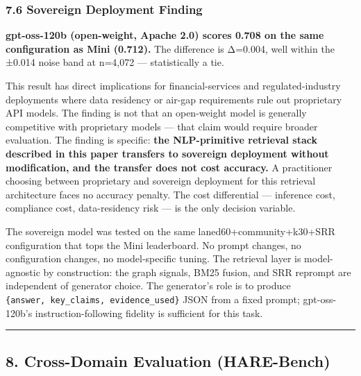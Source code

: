 \subsubsection{7.6 Sovereign Deployment Finding}\label{sovereign-deployment-finding}

\textbf{gpt-oss-120b (open-weight, Apache 2.0) scores 0.708 on the same configuration as Mini (0.712).} The difference is Δ=0.004, well within the ±0.014 noise band at n=4,072 --- statistically a tie.

This result has direct implications for financial-services and regulated-industry deployments where data residency or air-gap requirements rule out proprietary API models. The finding is not that an open-weight model is generally competitive with proprietary models --- that claim would require broader evaluation. The finding is specific: \textbf{the NLP-primitive retrieval stack described in this paper transfers to sovereign deployment without modification, and the transfer does not cost accuracy.} A practitioner choosing between proprietary and sovereign deployment for this retrieval architecture faces no accuracy penalty. The cost differential --- inference cost, compliance cost, data-residency risk --- is the only decision variable.

The sovereign model was tested on the same laned60+community+k30+SRR configuration that tops the Mini leaderboard. No prompt changes, no configuration changes, no model-specific tuning. The retrieval layer is model-agnostic by construction: the graph signals, BM25 fusion, and SRR reprompt are independent of generator choice. The generator's role is to produce \texttt{\{answer,\ key\_claims,\ evidence\_used\}} JSON from a fixed prompt; gpt-oss-120b's instruction-following fidelity is sufficient for this task.

\begin{center}\rule{0.5\linewidth}{0.5pt}\end{center}

\subsection{8. Cross-Domain Evaluation (HARE-Bench)}\label{cross-domain-evaluation-hare-bench}

